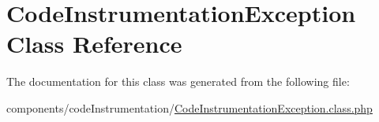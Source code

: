 \hypertarget{class_code_instrumentation_exception}{
\section{CodeInstrumentationException Class Reference}
\label{class_code_instrumentation_exception}
}


The documentation for this class was generated from the following file:\begin{CompactItemize}
\item 
components/codeInstrumentation/\hyperlink{_code_instrumentation_exception_8class_8php}{CodeInstrumentationException.class.php}\end{CompactItemize}
